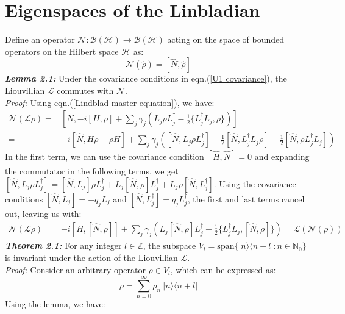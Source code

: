 \documentclass[11pt,a4paper]{article}
\begin{document}
\section{Eigenspaces of the Linbladian}
Define an operator $\mathcal{N}: \mathcal{B}(\mathcal{H}) \to \mathcal{B}(\mathcal{H})$ acting on the space of bounded operators on the Hilbert space $\mathcal{H}$ as:
\begin{equation}
    \mathcal{N}(\hat{\rho}) = [\hat{N}, \hat{\rho}]
\end{equation}
\textit{\textbf{Lemma 2.1: }} Under the covariance conditions in eqn.(\ref{U1 covariance}), the Liouvillian $\mathcal{L}$ commutes with $\mathcal{N}$. \\
\textit{Proof: }    Using eqn.(\ref{Lindblad master equation}), we have:
\begin{align}
    \mathcal{N} (\mathcal{L} \rho) = & [\hat{N}, -i[H, \rho] + \sum_{j} \gamma_j ( L_j \rho L_j^\dagger - \frac{1}{2} \{ L_j^\dagger L_j, \rho \} ) ] \\
    = & -i [\hat{N}, H \rho - \rho H] + \sum_{j} \gamma_j \left( [\hat{N}, L_j \rho L_j^\dagger] - \frac{1}{2} [\hat{N}, L_j^\dagger L_j \rho] - \frac{1}{2} [\hat{N}, \rho L_j^\dagger L_j] \right)
\end{align}
In the first term, we can use the covariance condition $[\hat{H},\hat{N}] = 0$ and expanding the commutator in the following terms, we get 
$[\hat{N}, L_j \rho L_j^\dagger] = [\hat{N}, L_j] \rho L_j^\dagger + L_j [\hat{N}, \rho] L_j^\dagger + L_j \rho [\hat{N}, L_j^\dagger]$. Using the covariance conditions $[\hat{N}, L_j] = -q_j L_j$ and $[\hat{N}, L_j^\dagger] = q_j L_j^\dagger$, the first and last terms cancel out, leaving us with:
\begin{align}
    \mathcal{N} (\mathcal{L} \rho) = & -i [H, [\hat{N}, \rho]] + \sum_{j} \gamma_j \left( L_j [\hat{N}, \rho] L_j^\dagger - \frac{1}{2} \{ L_j^\dagger L_j, [\hat{N}, \rho] \} \right)  = \mathcal{L} (\mathcal{N}(\rho))
\end{align}
\textit{\textbf{Theorem 2.1: }} For any integer $l \in \mathbb{Z}$, the subspace $V_l = \text{span} \{ |n\rangle \langle n+l| : n \in \mathbb{N}_0 \}$ is invariant under the action of the Liouvillian $\mathcal{L}$. \\
\textit{Proof: } Consider an arbitrary operator $\rho \in V_l$, which can be expressed as:
\begin{equation}
    \rho = \sum_{n=0}^{\infty} \rho_n \ |n\rangle \langle n+l|
\end{equation}
Using the lemma, we have:
\end{document}
